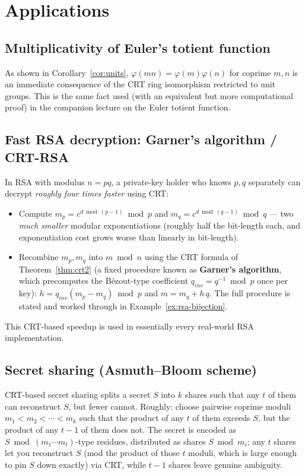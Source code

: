 \documentclass[11pt]{article}
\theoremstyle{definition}
\theoremstyle{remark}
\begin{document}
\section{Applications}

\subsection{Multiplicativity of Euler's totient function}
As shown in Corollary~\ref{cor:units}, $\varphi(mn)=\varphi(m)\varphi(n)$ for coprime $m,n$ is an immediate consequence of the CRT ring isomorphism restricted to unit groups. This is the same fact used (with an equivalent but more computational proof) in the companion lecture on the Euler totient function.

\subsection{Fast RSA decryption: Garner's algorithm / CRT-RSA}
In RSA with modulus $n=pq$, a private-key holder who knows $p,q$ separately can decrypt \emph{roughly four times faster} using CRT:
\begin{itemize}[leftmargin=1.4em]
\item Compute $m_p = c^{d \bmod (p-1)} \bmod p$ and $m_q = c^{d\bmod(q-1)} \bmod q$ — two \emph{much smaller} modular exponentiations (roughly half the bit-length each, and exponentiation cost grows worse than linearly in bit-length).
\item Recombine $m_p, m_q$ into $m \bmod n$ using the CRT formula of Theorem~\ref{thm:crt2} (a fixed procedure known as \textbf{Garner's algorithm}, which precomputes the Bézout-type coefficient $q_{inv}=q^{-1}\bmod p$ once per key): $h=q_{inv}(m_p-m_q)\bmod p$ and $m=m_q+h\,q$. The full procedure is stated and worked through in Example~\ref{ex:rsa-bijection}.
\end{itemize}
This CRT-based speedup is used in essentially every real-world RSA implementation.

\subsection{Secret sharing (Asmuth–Bloom scheme)}
CRT-based secret sharing splits a secret $S$ into $k$ shares such that any $t$ of them can reconstruct $S$, but fewer cannot. Roughly: choose pairwise coprime moduli $m_1<m_2<\cdots<m_k$ such that the product of any $t$ of them exceeds $S$, but the product of any $t-1$ of them does not. The secret is encoded as $S \bmod (m_1\cdots m_t)$-type residues, distributed as shares $S \bmod m_i$; any $t$ shares let you reconstruct $S$ (mod the product of those $t$ moduli, which is large enough to pin $S$ down exactly) via CRT, while $t-1$ shares leave genuine ambiguity.
\end{document}

